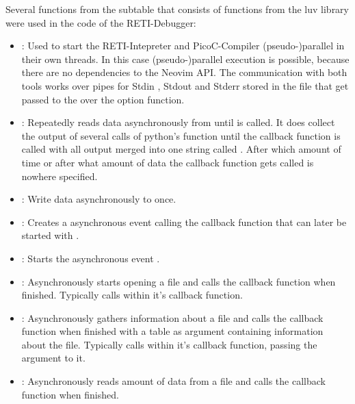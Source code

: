 \documentclass{report}
\begin{document}
Several functions from the subtable  that consists of functions from the \alert{luv} library were used in the code of the RETI-Debugger:
\begin{itemize}
  \item {}: Used to start the RETI-Intepreter and PicoC-Compiler (pseudo-)parallel in their own threads. In this case (pseudo-)parallel execution is possible, because there are no dependencies to the Neovim API. The communication with both tools works over \alert{pipes} for Stdin , Stdout  and Stderr  stored in the file  that get passed to the  over the option  function.
  \item {}: Repeatedly reads data asynchronously from  until  is called. It does collect the output of several calls of python's  function until the callback function is called with all output merged into one string called . After which amount of time or after what amount of data the callback function gets called is nowhere specified. 
  \item {}: Write data asynchronously to  once.
  \item {}: Creates a asynchronous event calling the callback function that can later be started with .
  \item {}: Starts the asynchronous event .
  \item {}: Asynchronously starts opening a file and calls the callback function when finished. Typically calls  within it's callback function.
  \item {}: Asynchronously gathers information about a file and calls the callback function when finished with a table as argument  containing information about the file. Typically calls  within it's callback function, passing the argument  to it.
  \item {}:  Asynchronously reads  amount of data from a file and calls the callback function when finished.

\end{itemize}
\end{document}
